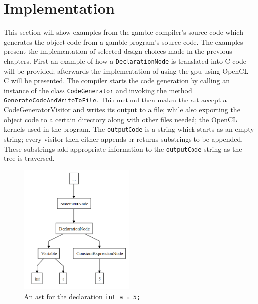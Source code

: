 \section{Implementation}
This section will show examples from the \gls{gamble} compiler's source code which generates the object code from a \gls{gamble} program's source code.
The examples present the implementation of selected design choices made in the previous chapters.
First an example of how a \texttt{DeclarationNode} is translated into C code will be provided; afterwards the implementation of using the \acrshort{gpu} using OpenCL C will be presented.
The compiler starts the code generation by calling an instance of the class \texttt{CodeGenerator} and invoking the method \texttt{GenerateCodeAndWriteToFile}.
This method then makes the \acrshort{ast} accept a CodeGeneratorVisitor and writes its output to a file; while also exporting the object code to a certain directory along with other files needed; the OpenCL kernels used in the program.
The \texttt{outputCode} is a string which starts as an empty string; every visitor then either appends or returns substrings to be appended.
These substrings add appropriate information to the \texttt{outputCode} string as the tree is traversed.

\begin{figure}
\centering
\includegraphics[width=0.5\textwidth]{figures/Trees/ASTAlone.PNG}
\caption{An \acrshort{ast} for the declaration \texttt{int a = 5;}}\label{fig:ASTAlone}
\end{figure}

